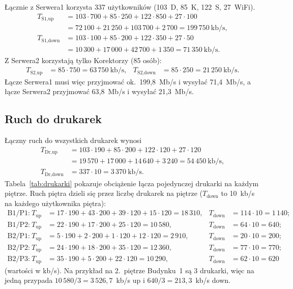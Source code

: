 \documentclass[12pt,a4paper]{article}
\begin{document}
Łącznie z Serwera1 korzysta 337 użytkowników (103~D, 85~K, 122~S, 27~WiFi).
\begin{align*}
T_{\text{S1,up}}   &= 103\cdot700 + 85\cdot250 + 122\cdot850 + 27\cdot100 \\
                    &= 72\,100 + 21\,250 + 103\,700 + 2\,700 = 199\,750~\text{kb/s},\\
T_{\text{S1,down}} &= 103\cdot100 + 85\cdot200 + 122\cdot350 + 27\cdot50 \\
                    &= 10\,300 + 17\,000 + 42\,700 + 1\,350 = 71\,350~\text{kb/s}.
\end{align*}
Z Serwera2 korzystają tylko Korektorzy (85 osób):
\begin{align*}
T_{\text{S2,up}}   &= 85\cdot750 = 63\,750~\text{kb/s}, &
T_{\text{S2,down}} &= 85\cdot250 = 21\,250~\text{kb/s}.
\end{align*}
Łącze Serwera1 musi więc przyjmować ok.\ 199{,}8~Mb/s i wysyłać 71{,}4~Mb/s,
a łącze Serwera2 przyjmować 63{,}8~Mb/s i wysyłać 21{,}3~Mb/s.

\subsection{Ruch do drukarek}

Łączny ruch do wszystkich drukarek wynosi
\begin{align*}
T_{\text{Dr,up}}   &= 103\cdot190 + 85\cdot200 + 122\cdot120 + 27\cdot120 \\
                    &= 19\,570 + 17\,000 + 14\,640 + 3\,240 = 54\,450~\text{kb/s},\\
T_{\text{Dr,down}} &= 337\cdot10 = 3\,370~\text{kb/s}.
\end{align*}
Tabela~\ref{tab:drukarki} pokazuje obciążenie łącza pojedynczej drukarki na
każdym piętrze. Ruch piętra dzieli się przez liczbę drukarek na piętrze
($T_\text{down}$ to 10~kb/s na każdego użytkownika piętra):
\begin{align*}
\text{B1/P1:}~T_\text{up} &= 17\cdot190 + 43\cdot200 + 39\cdot120 + 15\cdot120 = 18\,310,
  & T_\text{down} &= 114\cdot10 = 1\,140;\\
\text{B1/P2:}~T_\text{up} &= 22\cdot190 + 17\cdot200 + 25\cdot120 = 10\,580,
  & T_\text{down} &= 64\cdot10 = 640;\\
\text{B2/P1:}~T_\text{up} &= 5\cdot190 + 2\cdot200 + 1\cdot120 + 12\cdot120 = 2\,910,
  & T_\text{down} &= 20\cdot10 = 200;\\
\text{B2/P2:}~T_\text{up} &= 24\cdot190 + 18\cdot200 + 35\cdot120 = 12\,360,
  & T_\text{down} &= 77\cdot10 = 770;\\
\text{B2/P3:}~T_\text{up} &= 35\cdot190 + 5\cdot200 + 22\cdot120 = 10\,290,
  & T_\text{down} &= 62\cdot10 = 620
\end{align*}
(wartości w kb/s). Na przykład na 2.~piętrze Budynku~1 są 3 drukarki, więc na
jedną przypada $10\,580/3 = 3\,526{,}7$~kb/s up i $640/3 = 213{,}3$~kb/s down.
\end{document}
